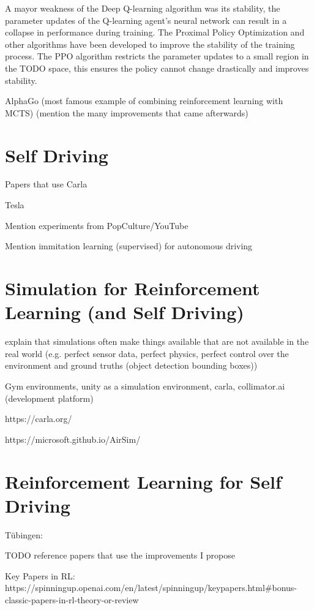 A mayor weakness of the Deep Q-learning algorithm was its stability, the parameter updates of the Q-learning agent's neural network can result in a collapse in performance during training. The Proximal Policy Optimization and other algorithms have been developed to improve the stability of the training process. The PPO \autocite{ppo} algorithm restricts the parameter updates to a small region in the TODO space, this ensures the policy cannot change drastically and improves stability.





AlphaGo (most famous example of combining reinforcement learning with MCTS) (mention the many improvements that came afterwards)


\section{Self Driving}

Papers that use Carla

Tesla \autocite{teslaEndToEnd}


Mention experiments from PopCulture/YouTube

Mention immitation learning (supervised) for autonomous driving

\section{Simulation for Reinforcement Learning (and Self Driving)}

explain that simulations often make things available that are not available in the real world (e.g. perfect sensor data, perfect physics, perfect control over the environment and ground truths (object detection bounding boxes))

Gym environments, unity as a simulation environment, carla, collimator.ai (development platform)

https://carla.org/

\autocite{carla}

https://microsoft.github.io/AirSim/
\autocite{airsim}


\section{Reinforcement Learning for Self Driving}


Tübingen:



TODO reference papers that use the improvements I propose

Key Papers in RL:
https://spinningup.openai.com/en/latest/spinningup/keypapers.html#bonus-classic-papers-in-rl-theory-or-review
